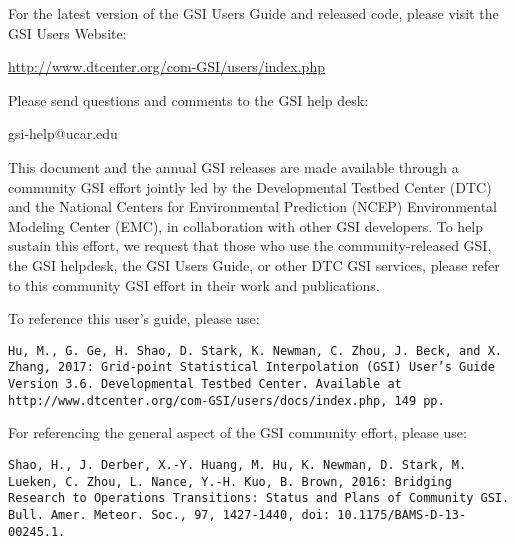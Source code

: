 \begin{titlepage}
\begin{flushleft}

For the latest version of the GSI User\textquotesingle s Guide and released code, please visit the GSI User\textquotesingle s Website:
\begin{center}
\url{http://www.dtcenter.org/com-GSI/users/index.php}
\end{center}

Please send questions and comments to the GSI help desk:
\begin{center}
gsi-help@ucar.edu
\end{center}

This document and the annual GSI releases are made available through a community GSI effort jointly led by the Developmental Testbed Center (DTC) and the National Centers for Environmental Prediction (NCEP) Environmental Modeling Center (EMC), in collaboration with other GSI developers. To help sustain this effort, we request that those who use the community-released GSI, the GSI helpdesk, the GSI User\textquotesingle s Guide, or other DTC GSI services, please refer to this community GSI effort in their work and publications. 

To reference this user's guide, please use:

\texttt{Hu, M., G. Ge, H. Shao, D. Stark, K. Newman, C. Zhou, J. Beck, and X. Zhang, 2017: Grid-point Statistical
Interpolation (GSI) User's Guide Version 3.6. Developmental Testbed Center. Available at
http://www.dtcenter.org/com-GSI/users/docs/index.php, 149 pp.}

For referencing the general aspect of the GSI community effort, please use:

\texttt{Shao, H., J. Derber, X.-Y. Huang, M. Hu, K. Newman, D. Stark, M. Lueken, C. Zhou, L. Nance, Y.-H. Kuo, B. Brown, 2016: Bridging Research to Operations Transitions: Status and Plans of Community GSI. Bull. Amer. Meteor. Soc., 97, 1427-1440, doi: 10.1175/BAMS-D-13-00245.1.}


\end{flushleft}
\end{titlepage}
\pagebreak{}





